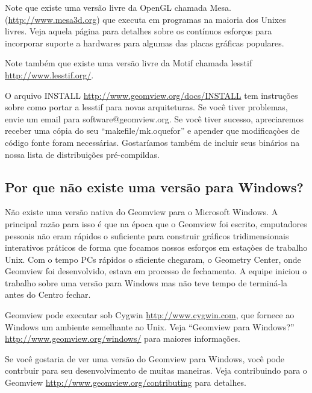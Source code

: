 \documentclass[12pt,a4paper]{article}
\begin{document}
        Note que existe uma vers\~ao livre da OpenGL chamada Mesa.
        (\url{http://www.mesa3d.org})
        que executa em programas na maioria dos Unixes livres.
        Veja aquela p\'agina para detalhes sobre os cont\'inuos esfor\c{c}os para incorporar
        suporte a hardwares para algumas das placas gr\'aficas populares.

        Note tamb\'em que existe uma vers\~ao livre da Motif chamada lesstif 
        \url{http://www.lesstif.org/}.

        O arquivo INSTALL \url{http://www.geomview.org/docs/INSTALL} tem instru\c{c}\~oes
        sobre como portar a lesstif para novas arquiteturas. Se voc\^e tiver problemas, envie um email para
        software@geomview.org. Se voc\^e tiver sucesso,
        apreciaremos receber uma c\'{o}pia do seu ``makefile/mk.oquefor'' e
        apender que modifica\c{c}òes de c\'{o}digo fonte foram necess\'arias. Gostar\'iamos tamb\'em
        de incluir seus bin\'arios na nossa lista de distribui\c{c}\~oes pr\'e-compildas.

    \subsection{Por que n\~ao existe uma vers\~ao para Windows?}

        N\~ao existe uma vers\~ao nativa do Geomview para o Microsoft Windows. A
        principal raz\~ao para isso \'e que na \'epoca que o Geomview foi escrito,
        cmputadores pessoais n\~ao eram r\'apidos o suficiente para construir gr\'aficos tridimensionais interativos
        pr\'aticos de forma que focamos nossos esfor\c{c}os em esta\c{c}òes de trabalho Unix. Com o tempo
        PCs r\'apidos o sficiente chegaram, o Geometry Center, onde Geomview foi
        desenvolvido, estava em processo de fechamento. A equipe iniciou o trabalho sobre uma
        vers\~ao para Windows mas n\~ao teve tempo de termin\'a-la antes do Centro
        fechar.

        Geomview pode executar sob Cygwin \url{http://www.cygwin.com}, que fornece
        ao Windows um ambiente semelhante ao Unix. Veja ``Geomview para Windows?''
        \url{http://www.geomview.org/windows/} para maiores informa\c{c}\~oes.

        Se voc\^e gostaria de ver uma vers\~ao do Geomview para Windows, voc\^e pode
        contrbuir para seu desenvolvimento de muitas maneiras. Veja contribuindo para o
        Geomview \url{http://www.geomview.org/contributing} para detalhes.
\end{document}
